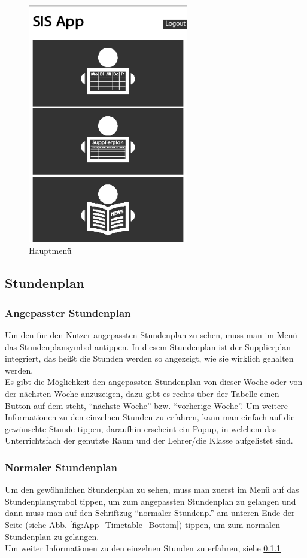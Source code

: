 \begin{figure}[H]
\centering
\includegraphics[keepaspectratio=true, width=7cm]{images/app_instructions/appMenu.png}
\caption{Hauptmenü}
\label{fig:App_Menu}
\end{figure}

\subsection{Stundenplan}
\subsubsection{Angepasster Stundenplan}
\label{sec:angepasster_stundenplan}
Um den für den Nutzer angepassten Stundenplan zu sehen, muss man im Menü das Stundenplansymbol antippen. In diesem Stundenplan ist der Supplierplan integriert, das heißt die Stunden werden so angezeigt, wie sie wirklich gehalten werden.\\
Es gibt die Möglichkeit den angepassten Stundenplan von dieser Woche oder von der nächsten Woche anzuzeigen, dazu gibt es rechts über der Tabelle einen Button auf dem steht, \enquote{nächste Woche} bzw. \enquote{vorherige Woche}.
Um weitere Informationen zu den einzelnen Stunden zu erfahren, kann man einfach auf die gewünschte Stunde tippen, daraufhin erscheint ein Popup, in welchem das Unterrichtsfach der genutzte Raum und der Lehrer/die Klasse aufgelistet sind.


\subsubsection{Normaler Stundenplan}
Um den gewöhnlichen Stundenplan zu sehen, muss man zuerst im Menü auf das Stundenplansymbol tippen, um zum angepassten Stundenplan zu gelangen und dann muss man auf den Schriftzug \enquote{normaler Stundenp.} am unteren Ende der Seite (siehe Abb. \ref{fig:App_Timetable_Bottom}) tippen, um zum normalen Stundenplan zu gelangen.\\
Um weiter Informationen zu den einzelnen Stunden zu erfahren, siehe \ref{sec:angepasster_stundenplan}


